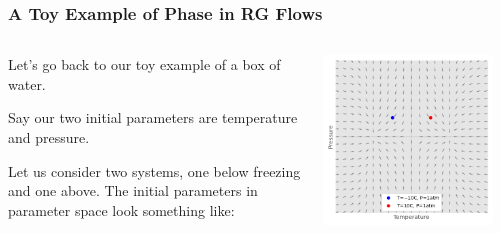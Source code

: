\documentclass[aspectratio=169, 12pt]{beamer}
\begin{document}
\begin{frame}

    \frametitle{A Toy Example of Phase in RG Flows}

    \begin{columns}
    \begin{column}{.6\textwidth}
    
        Let's go back to our toy example of a box of water. 

        \vspace{1em}

        Say our two initial parameters are temperature and pressure. 

        \vspace{1em}

        Let us consider two systems, one below freezing and one above. 
        The initial parameters in parameter space look something like:
        
    \end{column}
    \begin{column}{.4\textwidth}
        \includegraphics[width=0.9\textwidth]{images/labeled-fixed-points.png}
    \end{column}
    \end{columns}
    
\end{frame}
\end{document}
